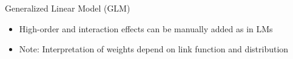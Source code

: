 \documentclass[11pt,compress,t,notes=noshow, aspectratio=169, xcolor=table]{beamer}
\begin{document}
\begin{frame}{Generalized Linear Model (GLM) }
\begin{itemize}[<+->]
        \item High-order and interaction effects can be manually added as in LMs
        \item Note: Interpretation of weights depend on link function and distribution
    \end{itemize}
\end{frame}
 	
\end{document}
